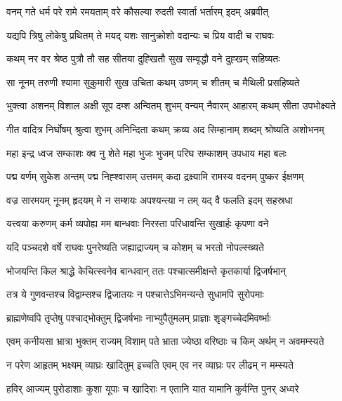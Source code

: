 
\twolineshloka
{वनम् गते धर्म परे रामे रमयताम् वरे}
{कौसल्या रुदती स्वार्ता भर्तारम् इदम् अब्रवीत्} %

\twolineshloka
{यद्यपि त्रिषु लोकेषु प्रथितम् ते मयद् यशः}
{सानुक्रोशो वदान्यः च प्रिय वादी च राघवः} %

\twolineshloka
{कथम् नर वर श्रेष्ठ पुत्रौ तौ सह सीतया}
{दुह्खितौ सुख सम्वृद्धौ वने दुह्खम् सहिष्यतः} %

\twolineshloka
{सा नूनम् तरुणी श्यामा सुकुमारी सुख उचिता}
{कथम् उष्णम् च शीतम् च मैथिली प्रसहिष्यते} %

\twolineshloka
{भुक्त्वा अशनम् विशाल अक्षी सूप दम्श अन्वितम् शुभम्}
{वन्यम् नैवारम् आहारम् कथम् सीता उपभोक्ष्यते} %

\twolineshloka
{गीत वादित्र निर्घोषम् श्रुत्वा शुभम् अनिन्दिता}
{कथम् क्रव्य अद सिम्हानाम् शब्दम् श्रोष्यति अशोभनम्} %

\twolineshloka
{महा इन्द्र ध्वज सम्काशः क्व नु शेते महा भुजः}
{भुजम् परिघ सम्काशम् उपधाय महा बलः} %

\twolineshloka
{पद्म वर्णम् सुकेश अन्तम् पद्म निह्श्वासम् उत्तमम्}
{कदा द्रक्ष्यामि रामस्य वदनम् पुष्कर ईक्षणम्} %

\twolineshloka
{वज्र सारमयम् नूनम् हृदयम् मे न सम्शयः}
{अपश्यन्त्या न तम् यद् वै फलति इदम् सहस्रधा} %

\twolineshloka
{यत्त्वया करुणम् कर्म व्यपोह्य मम बान्धवाः}
{निरस्ता परिधावन्ति सुखार्हः कृपणा वने} %

\twolineshloka
{यदि पञ्चदशे वर्षे राघवः पुनरेष्यति}
{जह्याद्राज्यम् च कोशम् च भरतो नोपल्स्ख्यते} %

\twolineshloka
{भोजयन्ति किल श्राद्धे केचित्स्वनेव बान्धवान्}
{ततः पश्चात्समीक्षन्ते कृतकार्या द्विजर्षभान्} %

\twolineshloka
{तत्र ये गुणवन्तश्च विद्वाम्सश्च द्विजातयः}
{न पश्चात्तेऽभिमन्यन्ते सुधामपि सुरोपमाः} %

\twolineshloka
{ब्राह्मणेष्वपि तृप्तेषु पश्चाद्भोक्तुम् द्विजर्षभाः}
{नाभ्युपैतुमलम् प्राज्ञाः शृङ्गच्चेदमिवर्ष्भाः} %

\twolineshloka
{एवम् कनीयसा भ्रात्रा भुक्तम् राज्यम् विशाम् पते}
{भ्राता ज्येष्ठा वरिष्ठाः च किम् अर्थम् न अवमम्स्यते} %

\twolineshloka
{न परेण आहृतम् भक्ष्यम् व्याघ्रः खादितुम् इच्चति}
{एवम् एव नर व्याघ्रः पर लीढम् न मम्स्यते} %

\twolineshloka
{हविर् आज्यम् पुरोडाशाः कुशा यूपाः च खादिराः}
{न एतानि यात यामानि कुर्वन्ति पुनर् अध्वरे} %

